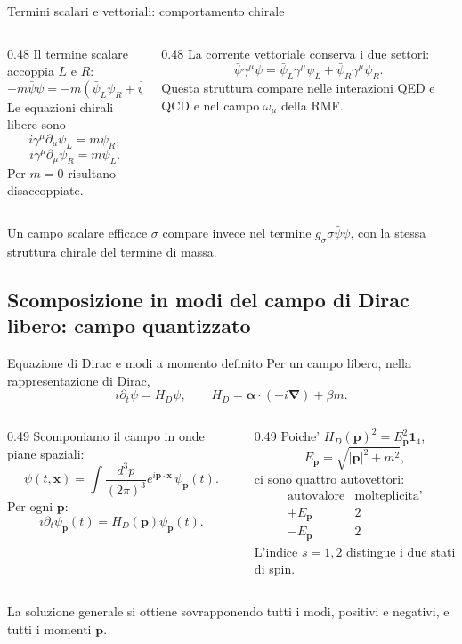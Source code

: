 \begin{frame}{Termini scalari e vettoriali: comportamento chirale}
\small
\begin{columns}[T,onlytextwidth]
\begin{column}{0.48\textwidth}
Il termine scalare accoppia $L$ e $R$:
\[
 -m\bar\psi\psi
 =-m(\bar\psi_L\psi_R+\bar\psi_R\psi_L).
\]
Le equazioni chirali libere sono
\[
 i\gamma^\mu\partial_\mu\psi_L=m\psi_R,
\]
\[
 i\gamma^\mu\partial_\mu\psi_R=m\psi_L.
\]
Per $m=0$ risultano disaccoppiate.
\end{column}
\begin{column}{0.48\textwidth}
La corrente vettoriale conserva i due settori:
\[
 \bar\psi\gamma^\mu\psi=
 \bar\psi_L\gamma^\mu\psi_L+
 \bar\psi_R\gamma^\mu\psi_R.
\]
Questa struttura compare nelle interazioni QED e QCD e nel campo $\omega_\mu$ della RMF.
\end{column}
\end{columns}
\medskip
Un campo scalare efficace $\sigma$ compare invece nel termine $g_\sigma\sigma\bar\psi\psi$, con la stessa struttura chirale del termine di massa.
\end{frame}

\subsection{Scomposizione in modi del campo di Dirac libero: campo quantizzato}

\begin{frame}{Equazione di Dirac e modi a momento definito}
\small
Per un campo libero, nella rappresentazione di Dirac,
\[
 i\partial_t\psi=H_D\psi,\qquad
 H_D=\boldsymbol\alpha\cdot(-i\boldsymbol\nabla)+\beta m.
\]
\begin{columns}[T,onlytextwidth]
\begin{column}{0.49\textwidth}
Scomponiamo il campo in onde piane spaziali:
\[
 \psi(t,\mathbf x)=\int\!\frac{d^3p}{(2\pi)^3}
 e^{i\mathbf p\cdot\mathbf x}\,\psi_{\mathbf p}(t).
\]
Per ogni $\mathbf p$:
\[
 i\partial_t\psi_{\mathbf p}(t)
 =H_D(\mathbf p)\psi_{\mathbf p}(t).
\]
\end{column}
\begin{column}{0.49\textwidth}
Poiche' $H_D(\mathbf p)^2=E_{\mathbf p}^2\mathbf1_4$,
\[
 E_{\mathbf p}=\sqrt{|\mathbf p|^2+m^2},
\]
ci sono quattro autovettori:
\[
 \begin{array}{c|c}
 \text{autovalore}&\text{molteplicita'}\\ \hline
 +E_{\mathbf p}&2\\
 -E_{\mathbf p}&2
 \end{array}
\]
L'indice $s=1,2$ distingue i due stati di spin.
\end{column}
\end{columns}
\medskip
La soluzione generale si ottiene sovrapponendo tutti i modi,
positivi e negativi, e tutti i momenti $\mathbf p$.
\end{frame}

